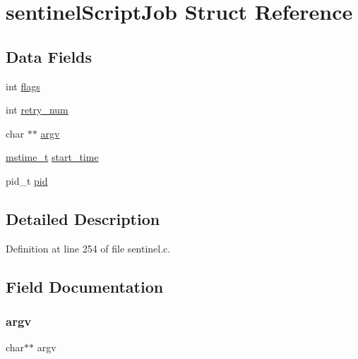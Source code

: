 \hypertarget{structsentinel_script_job}{}\section{sentinel\+Script\+Job Struct Reference}
\label{structsentinel_script_job}
\subsection*{Data Fields}
\begin{DoxyCompactItemize}
\item 
int \hyperlink{structsentinel_script_job_ac8bf36fe0577cba66bccda3a6f7e80a4}{flags}
\item 
int \hyperlink{structsentinel_script_job_ac3a9095a99d069bdd19aa9a53117ba04}{retry\+\_\+num}
\item 
char $\ast$$\ast$ \hyperlink{structsentinel_script_job_af2efa898e9eed6fe6715279cb1ec35b0}{argv}
\item 
\hyperlink{redismodule_8h_a652ae61e2475bc8957454534544968fc}{mstime\+\_\+t} \hyperlink{structsentinel_script_job_a1a4deca16d7aa189e7005dda267c5f40}{start\+\_\+time}
\item 
pid\+\_\+t \hyperlink{structsentinel_script_job_ae0d46a978d5cd6707411f276ad869b9c}{pid}
\end{DoxyCompactItemize}


\subsection{Detailed Description}


Definition at line 254 of file sentinel.\+c.



\subsection{Field Documentation}
\mbox{\label{structsentinel_script_job_af2efa898e9eed6fe6715279cb1ec35b0}} 
\subsubsection{\texorpdfstring{argv}{argv}}
{\footnotesize\ttfamily char$\ast$$\ast$ argv}



